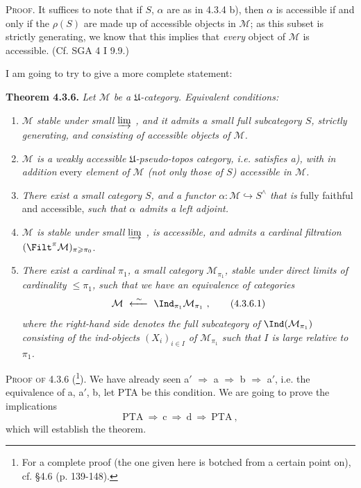 \noindent{}\textsc{Proof}. It suffices to note that if $S$, $\alpha$ are as in 4.3.4 b), then $\alpha$ is accessible if and only if the $\rho(S)$ are made up of accessible objects in $\mathcal M$; as this subset is strictly generating, we know that this implies that \textit{every} object of $\mathcal M$ is accessible. (Cf. SGA 4 I 9.9.)

\noindent I am going to try to give a more complete statement:

\noindent\textbf{Theorem 4.3.6.} \textit{Let $\mathcal M$ be a $\mathfrak U$-category. Equivalent conditions:}
\begin{enumerate}[label={}]
\item[\textit{a)}] \textit{$\mathcal M$ stable under small $\varinjlim$ , and it admits a small full subcategory $S$, strictly generating, and consisting of accessible objects of $\mathcal M$.}
\item[\textit{a$'$)}] \textit{$\mathcal M$ is a weakly accessible $\mathfrak U$-pseudo-topos category, i.e. satisfies a), with in addition} every \textit{element of $\mathcal M$ (not only those of $S$) accessible in $\mathcal M$.}
\item[\textit{b)}] \textit{There exist a small category $S$, and a functor $\alpha:\mathcal M\hookrightarrow S^\wedge$ that is} fully faithful and accessible, \textit{such that $\alpha$ admits a left adjoint.}
\item[\textit{c)}] \textit{$\mathcal M$ is stable under small $\varinjlim$ , is accessible, and admits a cardinal filtration} $(\Filt^\pi\mathcal M)_{\pi\geqslant\pi_0}$.
\item[\textit{d)}] \textit{There exist a cardinal $\pi_1$, a small category $\mathcal M_{\pi_1}$, stable under direct limits of cardinality $\leqslant\pi_1$, such that we have an equivalence of categories}
\[
\mathcal M\ \xleftarrow{\ \sim\ }\ \Ind_{\pi_1}\mathcal M_{\pi_1}\ ,
\tag*{(4.3.6.1)}
\]
\textit{where the right-hand side denotes the full subcategory of} $\Ind(\mathcal M_{\pi_1})$ \textit{consisting of the ind-objects $(X_i)_{i\in I}$ of $\mathcal M_{\pi_1}$ such that $I$ is large relative to $\pi_1$.}
\end{enumerate}

\noindent\textsc{Proof of} 4.3.6 (\footnote{For a complete proof (the one given here is botched from a certain point on), cf. §4.6 (p. 139-148).}). We have already seen a$'$ $\Longrightarrow$ a $\Longrightarrow$ b $\Longrightarrow$ a$'$, i.e. the equivalence of a, a$'$, b, let PTA be this condition. We are going to prove the implications
\[
\mathrm{PTA}\ \Longrightarrow\ \mathrm{c}\ \Longrightarrow\ \mathrm{d}\ \Longrightarrow\ \mathrm{PTA}\ ,
\]
%
which will establish the theorem.

